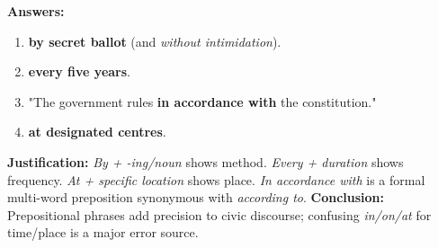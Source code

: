 \documentclass[11pt]{article}
\begin{document}
\begin{exoresolu}
\begin{center}
    \end{center}
    \vspace{0.3cm}
    \textbf{Answers:}
    \begin{enumerate}
        \item \textbf{by secret ballot} (and \emph{without intimidation}).
        \item \textbf{every five years}.
        \item "The government rules \textbf{in accordance with} the constitution."
        \item \textbf{at designated centres}.
    \end{enumerate}
    \textbf{Justification:} \emph{By + -ing/noun} shows method. \emph{Every + duration} shows frequency. \emph{At + specific location} shows place. \emph{In accordance with} is a formal multi-word preposition synonymous with \emph{according to}.
    \textbf{Conclusion:} Prepositional phrases add precision to civic discourse; confusing \emph{in/on/at} for time/place is a major error source.
\end{exoresolu}
\end{document}
